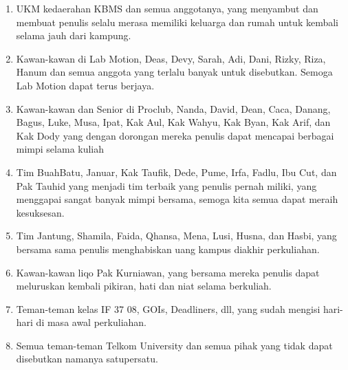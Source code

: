 \begin{enumerate}
      \item UKM kedaerahan KBMS dan semua anggotanya, yang menyambut dan membuat penulis selalu merasa memiliki keluarga dan rumah untuk kembali selama jauh dari kampung.
      \item Kawan-kawan di Lab Motion, Deas, Devy, Sarah, Adi, Dani, Rizky, Riza, Hanum dan semua anggota yang terlalu banyak untuk disebutkan. Semoga Lab Motion dapat terus berjaya.
      \item Kawan-kawan dan Senior di Proclub, Nanda, David, Dean, Caca, Danang, Bagus, Luke, Musa, Ipat, Kak Aul, Kak Wahyu, Kak Byan, Kak Arif, dan Kak Dody yang dengan dorongan mereka penulis dapat mencapai berbagai mimpi selama kuliah
      \item Tim BuahBatu, Januar, Kak Taufik, Dede, Pume, Irfa, Fadlu, Ibu Cut, dan Pak Tauhid yang menjadi tim terbaik yang penulis pernah miliki, yang menggapai sangat banyak mimpi bersama, semoga kita semua dapat meraih kesuksesan.
      \item Tim Jantung, Shamila, Faida, Qhansa, Mena, Lusi, Husna, dan Hasbi, yang bersama sama penulis menghabiskan uang kampus diakhir perkuliahan.
      \item Kawan-kawan liqo Pak Kurniawan, yang bersama mereka penulis dapat meluruskan kembali pikiran, hati dan niat selama berkuliah.
      \item Teman-teman kelas IF 37 08, GOIs, Deadliners, dll, yang sudah mengisi hari-hari di masa awal perkuliahan.
      \item Semua teman-teman Telkom University dan semua pihak yang tidak dapat disebutkan namanya satupersatu.
  \end{enumerate}